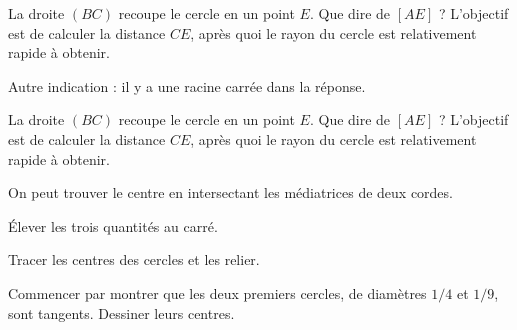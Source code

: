 \begin{Hint}{22}
La droite $(BC)$ recoupe le cercle en  un point $E$. Que dire de $[AE]$ ?
L'objectif est de calculer la distance $CE$, après quoi le rayon du cercle est relativement rapide à obtenir.

Autre indication : il y a une racine carrée dans la réponse.
\end{Hint}
\begin{Hint}{23}
La droite $(BC)$ recoupe le cercle en  un point $E$. Que dire de $[AE]$ ?
L'objectif est de calculer la distance $CE$, après quoi le rayon du cercle est relativement rapide à obtenir.
\end{Hint}
\begin{Hint}{24}
On peut trouver le centre en intersectant les médiatrices de deux cordes.
\end{Hint}
\begin{Hint}{25}
\end{Hint}
\begin{Hint}{26}
\end{Hint}
\begin{Hint}{27}

\end{Hint}
\begin{Hint}{28}

\end{Hint}
\begin{Hint}{29}
\end{Hint}
\begin{Hint}{30}
\end{Hint}
\begin{Hint}{31}
\end{Hint}
\begin{Hint}{32}
\end{Hint}
\begin{Hint}{33}
Élever les trois quantités au carré.
\end{Hint}
\begin{Hint}{34}
Tracer les centres des cercles et les relier.
\end{Hint}
\begin{Hint}{35}
Commencer par montrer que les deux premiers cercles, de diamètres $1/4$ et $1/9$, sont tangents. Dessiner leurs centres.
\end{Hint}
